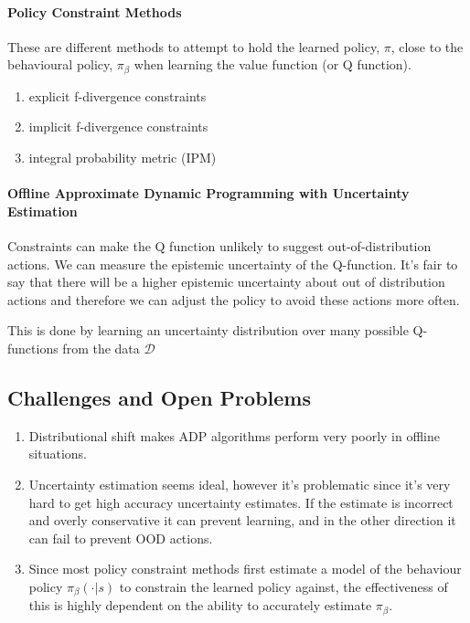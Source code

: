 \documentclass{article}
\begin{document}
\paragraph{Policy Constraint Methods}
These are different methods to attempt to hold the learned policy, \(\pi\), close to the behavioural policy, \(\pi_{\beta}\) when learning the value function (or Q function).
\begin{enumerate}
  \item explicit f-divergence constraints
  \item implicit f-divergence constraints
  \item integral probability metric (IPM)
\end{enumerate}

\paragraph{Offline Approximate Dynamic Programming with Uncertainty Estimation} Constraints can make the Q function unlikely to suggest out-of-distribution actions. We can measure the epistemic uncertainty of the Q-function. It's fair to say that there will be a higher epistemic uncertainty about out of distribution actions and therefore we can adjust the policy to avoid these actions more often.


This is done by learning an uncertainty distribution over many possible Q-functions from the data \(\mathcal{D}\)

\subsection{Challenges and Open Problems}
\begin{enumerate}
  \item Distributional shift makes ADP algorithms perform very poorly in offline situations.
  \item Uncertainty estimation seems ideal, however it's problematic since it's very hard to get high accuracy uncertainty estimates. If the estimate is incorrect and overly conservative it can prevent learning, and in the other direction it can fail to prevent OOD actions.
  \item Since most policy constraint methods first estimate a model of the behaviour policy \(\pi_{\beta}(\cdot | s)\) to constrain the learned policy against, the effectiveness of this is highly dependent on the ability to accurately estimate \(\pi_{\beta}\).
    \end{enumerate}
\end{document}
